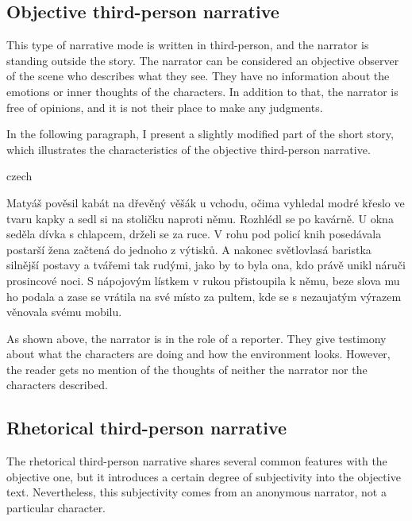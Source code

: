 \subsection{Objective third-person narrative}
This type of narrative mode is written in third-person, and the narrator is standing outside the story. The narrator can be considered an objective observer of the scene who describes what they see. They have no information about the emotions or inner thoughts of the characters. \cite{docekalova} In addition to that, the narrator is free of opinions, and it is not their place to make any judgments.

In the following paragraph, I present a slightly modified part of the short story, which illustrates the characteristics of the objective third-person narrative.
\newline

\begin{otherlanguage*}{czech}
\begin{quoting}
Matyáš pověsil kabát na dřevěný věšák u vchodu, očima vyhledal modré křeslo ve tvaru kapky a sedl si na stoličku naproti němu. Rozhlédl se po kavárně. U okna seděla dívka s chlapcem, drželi se za ruce. V rohu pod policí knih posedávala postarší žena začtená do jednoho z výtisků. A nakonec světlovlasá baristka silnější postavy a tvářemi tak rudými, jako by to byla ona, kdo právě unikl náruči prosincové noci. S nápojovým lístkem v rukou přistoupila k němu, beze slova mu ho podala a zase se vrátila na své místo za pultem, kde se s nezaujatým výrazem věnovala svému mobilu.
\newline
\end{quoting}
\end{otherlanguage*}


As shown above, the narrator is in the role of a reporter. They give testimony about what the characters are doing and how the environment looks. However, the reader gets no mention of the thoughts of neither the narrator nor the characters described.

\subsection{Rhetorical third-person narrative}
The rhetorical third-person narrative shares several common features with the objective one, but it introduces a certain degree of subjectivity into the objective text. Nevertheless, this subjectivity comes from an anonymous narrator, not a particular character. \cite{dolezel-narativni-zpusoby}
\newline

